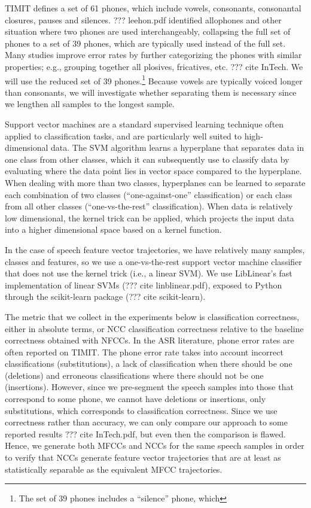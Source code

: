 TIMIT defines a set of 61 phones,
which include vowels, consonants,
consonantal closures, pauses and silences.
??? leehon.pdf identified
allophones and
other situation where two phones
are used interchangeably,
collapsing the full set of phones
to a set of 39 phones,
which are typically used
instead of the full set.
Many studies improve error rates
by further categorizing
the phones with similar properties;
e.g., grouping together all
plosives, fricatives, etc.
??? cite InTech.
We will use the reduced set of 39 phones.\footnote{
  The set of 39 phones includes a ``silence'' phone,
  which
}
Because vowels are typically voiced
longer than consonants,
we will investigate whether
separating them is necessary
since we lengthen all samples
to the longest sample.

Support vector machines are a standard
supervised learning technique
often applied to classification tasks,
and are particularly well suited
to high-dimensional data.
The SVM algorithm learns a hyperplane
that separates data
in one class from other classes,
which it can subsequently use
to classify data
by evaluating where the data point
lies in vector space compared to the hyperplane.
When dealing with more than two classes,
hyperplanes can be learned to separate
each combination of two classes
(``one-against-one'' classification)
or each class from all other classes
(``one-vs-the-rest'' classification).
When data is relatively low dimensional,
the kernel trick can be applied,
which projects the input data
into a higher dimensional space
based on a kernel function.

In the case of speech feature vector trajectories,
we have relatively many samples,
classes and features,
so we use a one-vs-the-rest
support vector machine classifier
that does not use the kernel trick
(i.e., a linear SVM).
We use LibLinear's fast implementation
of linear SVMs (??? cite linblinear.pdf),
exposed to Python through
the scikit-learn package
(??? cite scikit-learn).  %

The metric that we collect
in the experiments below
is classification correctness,
either in absolute terms,
or NCC classification correctness
relative to the baseline correctness
obtained with NFCCs.
In the ASR literature,
phone error rates are often
reported on TIMIT.
The phone error rate
takes into account
incorrect classifications
(substitutions),
a lack of classification
when there should be one
(deletions)
and erroneous classifications
where there should not be one
(insertions).
However, since we pre-segment
the speech samples into
those that correspond to some phone,
we cannot have deletions or insertions,
only substitutions,
which corresponds to classification correctness.
Since we use correctness
rather than accuracy,
we can only compare our approach
to some reported results
??? cite InTech.pdf,
but even then the comparison is flawed.
Hence, we generate both MFCCs
and NCCs for the same speech samples
in order to verify that
NCCs generate feature vector trajectories
that are at least as statistically separable
as the equivalent MFCC trajectories.

